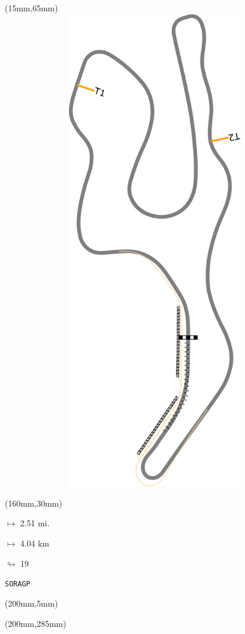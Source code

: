 \begin{textblock*}{185mm}(15mm,65mm)%
\centering
\mbox{\includegraphics[width=185mm,height=210mm,keepaspectratio]{PT/SORAGP.pdf}}
\end{textblock*}
\begin{textblock*}{40mm}(160mm,30mm)%
\Large
\par$\mapsto$ 2.51 mi.
\par$\mapsto$ 4.04 km
\par$\looparrowright$ 19
\par\hfill\tiny\tt SORAGP\\
\end{textblock*}
\begin{textblock*}{20mm}(200mm,5mm)%
\fbox{\thepage}
\label{SORAGP}
\end{textblock*}
\begin{textblock*}{20mm}(200mm,285mm)%
\fbox{\thepage}
\end{textblock*}

